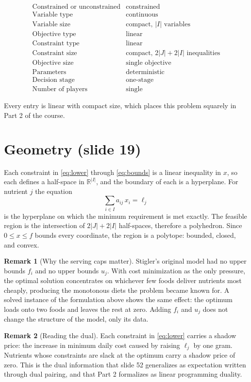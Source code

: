 \documentclass[11pt]{article}
\theoremstyle{definition}
\newtheorem*{remark}{Remark}
\begin{document}
\[
\begin{array}{ll}
  \text{Constrained or unconstrained}      & \text{constrained} \\
  \text{Variable type}                     & \text{continuous} \\
  \text{Variable size}                     & \text{compact, } |I| \text{ variables} \\
  \text{Objective type}                    & \text{linear} \\
  \text{Constraint type}                   & \text{linear} \\
  \text{Constraint size}                   & \text{compact, } 2|J| + 2|I| \text{ inequalities} \\
  \text{Objective size}                    & \text{single objective} \\
  \text{Parameters}                        & \text{deterministic} \\
  \text{Decision stage}                    & \text{one-stage} \\
  \text{Number of players}                 & \text{single}
\end{array}
\]

Every entry is linear with compact size, which places this problem
squarely in Part 2 of the course.

\section{Geometry (slide 19)}

Each constraint in \eqref{eq:lower} through \eqref{eq:bounds} is a
linear inequality in $x$, so each defines a half-space in
$\mathbb{R}^{|I|}$, and the boundary of each is a hyperplane. For
nutrient $j$ the equation
\[
  \sum_{i \in I} a_{ij}\, x_i = \ell_j
\]
is the hyperplane on which the minimum requirement is met exactly. The
feasible region is the intersection of $2|J| + 2|I|$ half-spaces,
therefore a polyhedron. Since $0 \le x \le f$ bounds every coordinate,
the region is a polytope: bounded, closed, and convex.

\begin{remark}[Why the serving caps matter]
Stigler's original model had no upper bounds $f_i$ and no upper bounds
$u_j$. With cost minimization as the only pressure, the optimal solution
concentrates on whichever few foods deliver nutrients most cheaply,
producing the monotonous diets the problem became known for. A solved
instance of the formulation above shows the same effect: the optimum
loads onto two foods and leaves the rest at zero. Adding $f_i$ and $u_j$
does not change the structure of the model, only its data.
\end{remark}

\begin{remark}[Reading the dual]
Each constraint in \eqref{eq:lower} carries a shadow price: the increase
in minimum daily cost caused by raising $\ell_j$ by one gram. Nutrients
whose constraints are slack at the optimum carry a shadow price of zero.
This is the dual information that slide 52 generalizes as expectation
written through dual pairing, and that Part 2 formalizes as linear
programming duality.
\end{remark}
\end{document}
